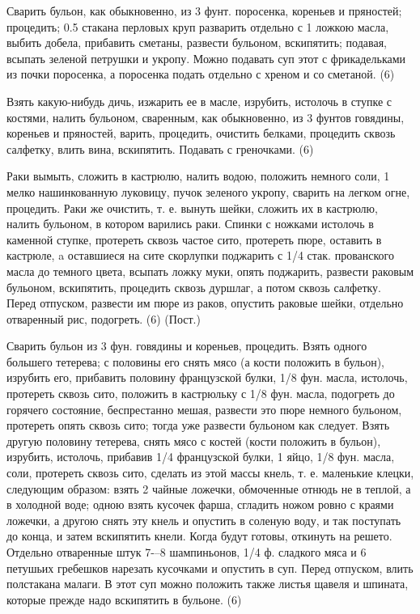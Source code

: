 Сварить бульон, как обыкновенно, из 3 фунт. поросенка, кореньев и пряностей; процедить; 0.5 стакана перловых круп разварить отдельно с 1 ложкою масла, выбить добела, прибавить сметаны, развести бульоном, вскипятить; подавая, всыпать зеленой петрушки и укропу. Можно подавать суп этот с фрикадельками из почки поросенка, а поросенка подать отдельно с хреном и со сметаной. (6)


Взять какую-нибудь дичь, изжарить ее в масле, изрубить, истолочь в ступке с костями, налить бульоном, сваренным, как обыкновенно, из 3 фунтов говядины, кореньев и пряностей, варить, процедить, очистить белками, процедить сквозь салфетку, влить вина, вскипятить. Подавать с греночками. (6)


Раки вымыть, сложить в кастрюлю, налить водою, положить немного соли, 1 мелко нашинкованную луковицу, пучок зеленого укропу, сварить на легком огне, процедить. Раки же очистить, т. е. вынуть шейки, сложить их в кастрюлю, налить бульоном, в котором варились раки. Спинки с ножками истолочь в каменной ступке, протереть сквозь частое сито, протереть пюре, оставить в кастрюле, a оставшиеся на сите скорлупки поджарить с 1/4 стак. прованского масла до темного цвета, всыпать ложку муки, опять поджарить, развести раковым бульоном, вскипятить, процедить сквозь дуршлаг, а потом сквозь салфетку. Перед отпуском, развести им пюре из раков, опустить раковые шейки, отдельно отваренный рис, подогреть. (6) (Пост.)


Сварить бульон из 3 фун. говядины и кореньев, процедить. Взять одного большего тетерева; с половины его снять мясо (а кости положить в бульон), изрубить его, прибавить половину французской булки, 1/8 фун. масла, истолочь, протереть сквозь сито, положить в кастрюльку с 1/8 фун. масла, подогреть до горячего состояние, беспрестанно мешая, развести это пюре немного бульоном, протереть опять сквозь сито; тогда уже развести бульоном как следует. Взять другую половину тетерева, снять мясо с костей (кости положить в бульон), изрубить, истолочь, прибавив 1/4 французской булки, 1 яйцо, 1/8 фун. масла, соли, протереть сквозь сито, сделать из этой массы кнель, т. е. маленькие клецки, следующим образом: взять 2 чайные ложечки, обмоченные отнюдь не в теплой, а в холодной воде; одною взять кусочек фарша, сгладить ножом ровно с краями ложечки, а другою снять эту кнель и опустить в соленую воду, и так поступать до конца, и затем вскипятить кнели. Когда будут готовы, откинуть на решето. Отдельно отваренные штук 7-–8 шампиньонов, 1/4 ф. сладкого мяса и 6 петушьих гребешков нарезать кусочками и опустить в суп. Перед отпуском, влить полстакана малаги. В этот суп можно положить также листья щавеля и шпината, которые прежде надо вскипятить в бульоне. (6)

